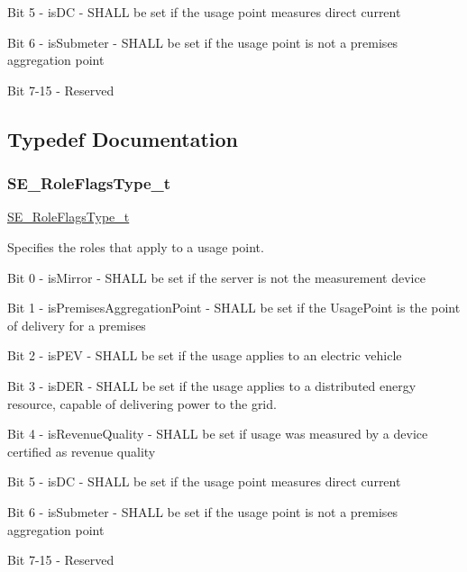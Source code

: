 Bit 5 -\/ is\+DC -\/ S\+H\+A\+LL be set if the usage point measures direct current

Bit 6 -\/ is\+Submeter -\/ S\+H\+A\+LL be set if the usage point is not a premises aggregation point

Bit 7-\/15 -\/ Reserved 

\subsection{Typedef Documentation}
\mbox{\label{group__RoleFlagsType_gac20b70bba5dd7d6773b13d69c372c957}} 
\subsubsection{\texorpdfstring{S\+E\+\_\+\+Role\+Flags\+Type\+\_\+t}{SE\_RoleFlagsType\_t}}
{\footnotesize\ttfamily \hyperlink{group__RoleFlagsType_gac20b70bba5dd7d6773b13d69c372c957}{S\+E\+\_\+\+Role\+Flags\+Type\+\_\+t}}

Specifies the roles that apply to a usage point.

Bit 0 -\/ is\+Mirror -\/ S\+H\+A\+LL be set if the server is not the measurement device

Bit 1 -\/ is\+Premises\+Aggregation\+Point -\/ S\+H\+A\+LL be set if the Usage\+Point is the point of delivery for a premises

Bit 2 -\/ is\+P\+EV -\/ S\+H\+A\+LL be set if the usage applies to an electric vehicle

Bit 3 -\/ is\+D\+ER -\/ S\+H\+A\+LL be set if the usage applies to a distributed energy resource, capable of delivering power to the grid.

Bit 4 -\/ is\+Revenue\+Quality -\/ S\+H\+A\+LL be set if usage was measured by a device certified as revenue quality

Bit 5 -\/ is\+DC -\/ S\+H\+A\+LL be set if the usage point measures direct current

Bit 6 -\/ is\+Submeter -\/ S\+H\+A\+LL be set if the usage point is not a premises aggregation point

Bit 7-\/15 -\/ Reserved 